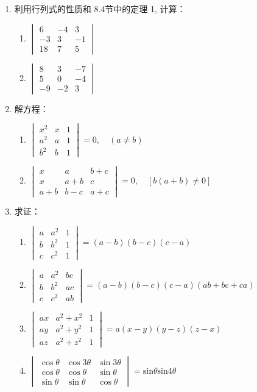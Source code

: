 \begin{enumerate}
\item 利用行列式的性质和 8.4节中的定理 1, 计算：
\begin{multicols}{2}
\begin{enumerate}[(1)]
  \item $\begin{vmatrix}6&-4&3\\-3&3&-1\\18&7&5\end{vmatrix}$
  \item $\begin{vmatrix}8&3&-7\\5&0&-4\\-9&-2&3\end{vmatrix}$
\end{enumerate}
\end{multicols}
\item 解方程：
\begin{enumerate}[(1)]
  \item $\begin{vmatrix} x^2& x& 1\\ a^2& a& 1\\ b^2& b& 1\end{vmatrix} = 0,\quad ( a\neq b)$
  \item $\begin{vmatrix} {x}& {a}& {b+ c}\\ {x}& {a+ b}& {c}\\ {a+ b}& {b- c}& {a+ c}
  \end{vmatrix} = 0,\quad [b( a+ b) \neq 0]$
\end{enumerate}

\item 求证：
\begin{enumerate}[(1)]
  \item $\begin{vmatrix}a&a^2&1\\b&b^2&1\\c&c^2&1\end{vmatrix}=(a-b)(b-c)(c-a)$
  \item $\begin{vmatrix}a&a^2&bc\\b&b^2&ac\\c&c^2&ab\end{vmatrix}=(a-b)\left(b-c\right)\left(c-a\right)\left(ab+bc+ca\right)$
  \item $\begin{vmatrix}ax&a^{2}+x^{2}&1\\ay&a^{2}+y^{2}&1\\az&a^{2}+z^{2}&1\end{vmatrix}=a(x-y)(y-z)(z-x)$
  \item $\begin{vmatrix}\cos\theta&\cos3\theta&\sin3\theta\\\cos\theta&\cos\theta&\sin\theta\\\sin\theta&\sin\theta&\cos\theta\end{vmatrix}=\mathrm{sin}\theta\mathrm{sin}4\theta$
\end{enumerate}


\end{enumerate}
